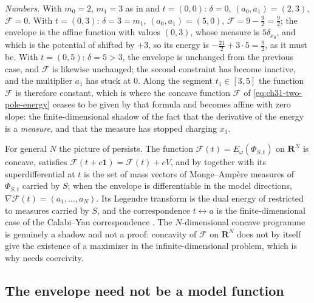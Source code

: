 \begin{example}
\emph{Numbers.}  With \(m_0=2\), \(m_1=3\) as in
 and \(t=(0,0)\): \(\delta=0\),
\((a_0,a_1)=(2,3)\), \(\mathcal F=0\).  With \(t=(0,3)\): \(\delta=3=m_1\),
\((a_0,a_1)=(5,0)\), \(\mathcal F=9-\tfrac92=\tfrac92\); the envelope is the
affine function with values \((0,3)\), whose measure is \(5\delta_{x_0}\),
and which is the potential of  shifted by
\(+3\), so its energy is \(-\tfrac{21}2+3\cdot5=\tfrac92\), as it must be.
With \(t=(0,5)\): \(\delta=5>3\), the envelope is unchanged from the
previous case, and \(\mathcal F\) is likewise unchanged; the second constraint has
become inactive, and the multiplier \(a_1\) has stuck at \(0\).  Along the
segment \(t_1\in[3,5]\) the function \(\mathcal F\) is therefore constant, which is
where the concave function \(\mathcal F\) of \eqref{eq:ch31-two-pole-energy} ceases
to be given by that formula and becomes affine with zero slope: the
finite-dimensional shadow of the fact that the derivative of the energy is a
\emph{measure}, and that the measure has stopped charging \(x_1\).
\end{example}

\begin{remark}
\label{rem:ch31-programme-general}
For general \(N\) the picture of  persists.
The function
\(\mathcal F(t)=E_\omega(\Phi_{S,t})\) on \(\mathbf R^N\) is concave, satisfies
\(\mathcal F(t+c\mathbf 1)=\mathcal F(t)+cV\), and by
 together with
 its superdifferential at \(t\) is
the set of mass vectors of Monge--Amp\`ere measures of \(\Phi_{S,t}\)
carried by \(S\); when the envelope is differentiable in the model
directions, \(\nabla\mathcal F(t)=(a_1,\ldots,a_N)\).  Its Legendre transform is
the dual energy of  restricted to measures
carried by \(S\), and the correspondence
\(t\leftrightarrow a\) is the finite-dimensional case of the
Calabi--Yau correspondence .  The
\(N\)-dimensional concave programme is genuinely a shadow and not a proof:
concavity of \(\mathcal F\) on \(\mathbf R^N\) does not by itself give the
existence of a maximizer in the infinite-dimensional problem, which is why
 needs coercivity.
\end{remark}

\subsection{The envelope need not be a model function}
\label{sec:ch31-not-model}

